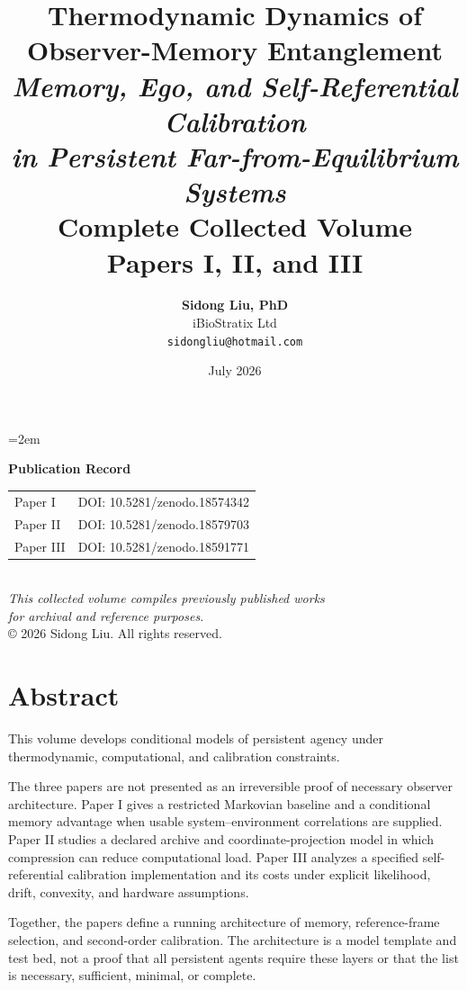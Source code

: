\documentclass[12pt,a4paper,openany]{book}
\title{
  \vspace{-2cm}
  {\Huge\textbf{Thermodynamic Dynamics of\\Observer-Memory Entanglement}}\\[1cm]
  {\Large\textit{Memory, Ego, and Self-Referential Calibration\\ in Persistent Far-from-Equilibrium Systems}}\\[2cm]
  {\large Complete Collected Volume}\\[0.5cm]
  {\normalsize Papers I, II, and III}
}
\author{
  \textbf{Sidong Liu, PhD}\\[0.5em]
  iBioStratix Ltd\\[0.3em]
  \texttt{sidongliu@hotmail.com}
}
\date{July 2026}
\begin{document}
\emergencystretch=2em
\raggedbottom
{}

\frontmatter
\maketitle

\newpage
\thispagestyle{empty}
\vspace*{\fill}
\begin{center}
\textbf{Publication Record}\\[2em]
\begin{tabular}{ll}
Paper I & DOI: 10.5281/zenodo.18574342 \\
Paper II & DOI: 10.5281/zenodo.18579703 \\
Paper III & DOI: 10.5281/zenodo.18591771 \\
\end{tabular}
\\[3em]
\textit{This collected volume compiles previously published works\\
for archival and reference purposes.}
\\[2em]
\copyright{} 2026 Sidong Liu. All rights reserved.
\end{center}
\vspace*{\fill}

\chapter*{Abstract}

This volume develops conditional models of persistent agency under thermodynamic, computational, and calibration constraints.

The three papers are not presented as an irreversible proof of necessary observer architecture.  Paper I gives a restricted Markovian baseline and a conditional memory advantage when usable system--environment correlations are supplied.  Paper II studies a declared archive and coordinate-projection model in which compression can reduce computational load.  Paper III analyzes a specified self-referential calibration implementation and its costs under explicit likelihood, drift, convexity, and hardware assumptions.

Together, the papers define a running architecture of memory, reference-frame selection, and second-order calibration.  The architecture is a model template and test bed, not a proof that all persistent agents require these layers or that the list is necessary, sufficient, minimal, or complete.
\end{document}
